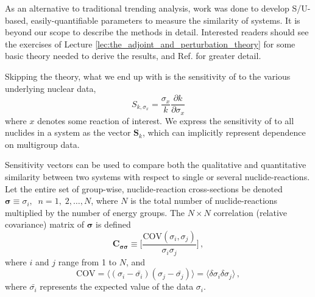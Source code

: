 As an alternative to traditional trending analysis, work was done to 
develop S/U-based, easily-quantifiable parameters to measure the 
similarity of systems.  It is beyond our scope to describe the 
methods in detail.  Interested readers should see the exercises
of Lecture \ref{lec:the_adjoint_and_perturbation_theory} for some
basic theory needed to derive the results, and Ref. 
\cite{broadhead2004sau} for greater detail.

Skipping the theory, what we end up with is the sensitivity
of \keff to the various underlying nuclear data, 
\begin{equation}
 S_{k,\sigma_x} = \frac{\sigma_x}{k}\frac{\partial k}{\partial \sigma_x} 
 \label{eq:keffsens}
\end{equation}
where $x$ denotes some reaction of interest.  We express the sensitivity 
of \keff to all nuclides in a system as the vector $\mathbf{S}_k$,
which can implicitly represent dependence on multigroup data.

Sensitivity vectors can be used to compare both the qualitative and 
quantitative similarity between two systems with respect to single or 
several nuclide-reactions. Let the entire set of group-wise, nuclide-reaction 
cross-sections be denoted 
$\bm{\sigma} \equiv \sigma_i, \; \; n = 1,\;2,\ldots,N$, where $N$ is the 
total number of nuclide-reactions multiplied by the number of energy 
groups.  The $N\times N$ correlation (\ie relative covariance) matrix 
of $\bm{\sigma}$ is defined
\begin{equation}
\mathbf{C_{\sigma \sigma}} \equiv \Bigg[\frac{\mathrm{COV}(\sigma_i,\sigma_j)}
                                             {\sigma_i \sigma_j} \Bigg ] \, ,
\end{equation}
where $i$ and $j$ range from 1 to $N$, and 
\begin{equation}
\mathrm{COV} = \langle (\sigma_i - \bar{\sigma_i})(\sigma_j - 
               \bar{\sigma_j}) \rangle 
             = \langle \delta \sigma_i \delta \sigma_j \rangle \, ,
\end{equation}
where $\bar{\sigma_i}$ represents the expected value of the data $\sigma_i$.  

